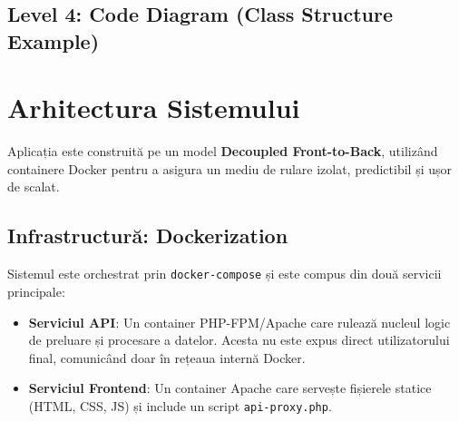 \documentclass[12pt,a4paper]{article}
\begin{document}
\subsection{Level 4: Code Diagram (Class Structure Example)}
\begin{center}
\end{center}

\newpage
\section{Arhitectura Sistemului}

Aplicația este construită pe un model \textbf{Decoupled Front-to-Back}, utilizând containere Docker pentru a asigura un mediu de rulare izolat, predictibil și ușor de scalat.

\subsection{Infrastructură: Dockerization}
Sistemul este orchestrat prin \texttt{docker-compose} și este compus din două servicii principale:
\begin{itemize}
    \item \textbf{Serviciul API}: Un container PHP-FPM/Apache care rulează nucleul logic de preluare și procesare a datelor. Acesta nu este expus direct utilizatorului final, comunicând doar în rețeaua internă Docker.
    \item \textbf{Serviciul Frontend}: Un container Apache care servește fișierele statice (HTML, CSS, JS) și include un script \texttt{api-proxy.php}.
\end{itemize}
\end{document}
